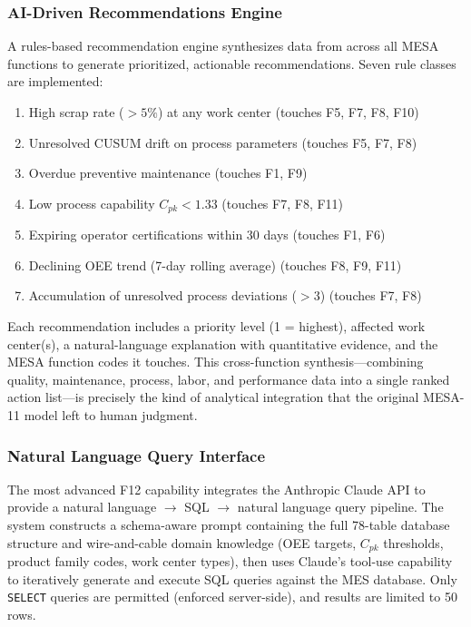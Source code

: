 \subsubsection{AI-Driven Recommendations Engine}

A rules-based recommendation engine synthesizes data from across all MESA
functions to generate prioritized, actionable recommendations.  Seven rule
classes are implemented:

\begin{enumerate}[leftmargin=2em, itemsep=1pt]
\item High scrap rate ($>5\%$) at any work center (touches F5, F7, F8, F10)
\item Unresolved CUSUM drift on process parameters (touches F5, F7, F8)
\item Overdue preventive maintenance (touches F1, F9)
\item Low process capability $C_{pk} < 1.33$ (touches F7, F8, F11)
\item Expiring operator certifications within 30 days (touches F1, F6)
\item Declining OEE trend (7-day rolling average) (touches F8, F9, F11)
\item Accumulation of unresolved process deviations ($>3$) (touches F7, F8)
\end{enumerate}

Each recommendation includes a priority level (1 = highest), affected work
center(s), a natural-language explanation with quantitative evidence, and the
MESA function codes it touches.  This cross-function synthesis---combining
quality, maintenance, process, labor, and performance data into a single ranked
action list---is precisely the kind of analytical integration that the original
MESA-11 model left to human judgment.

\subsubsection{Natural Language Query Interface}

The most advanced F12 capability integrates the Anthropic Claude API to provide
a natural language $\to$ SQL $\to$ natural language query pipeline.  The system
constructs a schema-aware prompt containing the full 78-table database structure
and wire-and-cable domain knowledge (OEE targets, $C_{pk}$ thresholds, product
family codes, work center types), then uses Claude's tool-use capability to
iteratively generate and execute SQL queries against the MES database.  Only
\texttt{SELECT} queries are permitted (enforced server-side), and results are
limited to 50 rows.


